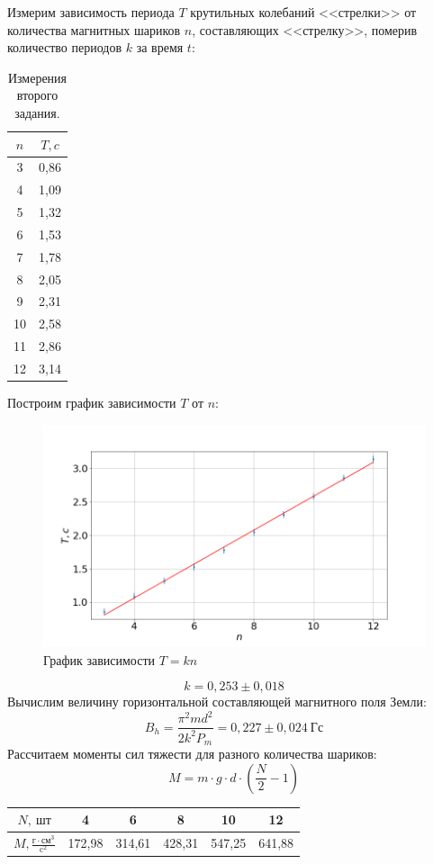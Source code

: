 \documentclass[a4paper, fontsize=14pt]{article}
\begin{document}
Измерим зависимость периода $T$ крутильных колебаний <<стрелки>> от количества магнитных шариков $n$, составляющих <<стрелку>>, померив количество периодов $k$ за время $t$:
\begin{table}[H]
	\centering
	\begin{tabular}{|c|c|} \hline
$n$ &     $T, c$ \\\hline
3 &  0,86 \\\hline
4 &  1,09 \\\hline
5 &  1,32 \\\hline
6 &  1,53 \\\hline
7 &  1,78 \\\hline
8 &  2,05 \\\hline
9 &  2,31 \\\hline
10 &  2,58 \\\hline
11 &  2,86 \\\hline
12 &  3,14 \\\hline
	\end{tabular}
	\caption{Измерения второго задания.}
\end{table}
Построим график зависимости $T$ от $n$:
\begin{figure}[H]
	\includegraphics[width = 0.9\linewidth]{2.png}
	\caption{График зависимости $T = kn$}
	\end{figure}
\[
	k = 0,253 \pm 0,018
\]
Вычислим величину горизонтальной составляющей магнитного поля Земли:
\[
	B_h = \frac{\pi^2 m d^2}{2 k^2 P_m} = 0,227 \pm 0,024\ \text{Гс}
\]
Рассчитаем моменты сил тяжести для разного количества шариков:
\[
	M = m\cdot g \cdot d \cdot (\frac{N}{2} - 1)
\]
\begin{table}[H]
	\centering
	\begin{tabular}{|c|c|c|c|c|c|} \hline
	$N,\ \text{шт}$	 & 4 & 6 & 8 & 10 & 12					\\\hline
	$M, \frac{\text{г} \cdot \text{см}^3}{\text{c}^2}$	& 172,98 & 314,61 & 428,31 & 547,25 & 641,88	\\\hline
\end{tabular}
\end{table}
\end{document}
